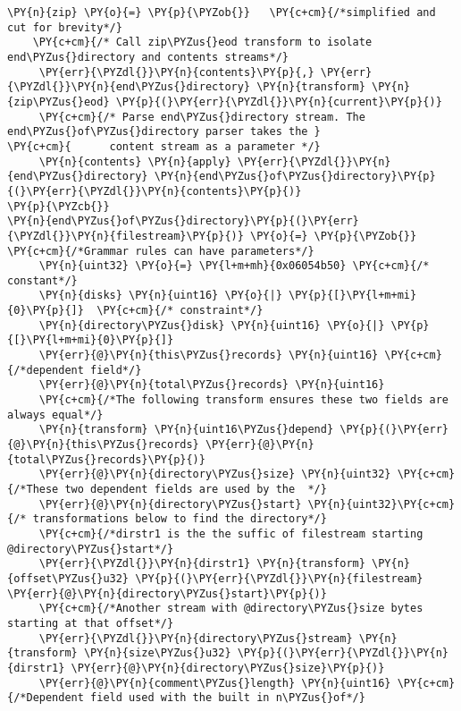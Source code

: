 \begin{Verbatim}[commandchars=\\\{\},codes={\catcode`\$=3\catcode`\^=7\catcode`\_=8}]
\PY{n}{zip} \PY{o}{=} \PY{p}{\PYZob{}}   \PY{c+cm}{/*simplified and cut for brevity*/}
    \PY{c+cm}{/* Call zip\PYZus{}eod transform to isolate end\PYZus{}directory and contents streams*/}
     \PY{err}{\PYZdl{}}\PY{n}{contents}\PY{p}{,} \PY{err}{\PYZdl{}}\PY{n}{end\PYZus{}directory} \PY{n}{transform} \PY{n}{zip\PYZus{}eod} \PY{p}{(}\PY{err}{\PYZdl{}}\PY{n}{current}\PY{p}{)}
     \PY{c+cm}{/* Parse end\PYZus{}directory stream. The end\PYZus{}of\PYZus{}directory parser takes the }
\PY{c+cm}{      content stream as a parameter */}
     \PY{n}{contents} \PY{n}{apply} \PY{err}{\PYZdl{}}\PY{n}{end\PYZus{}directory} \PY{n}{end\PYZus{}of\PYZus{}directory}\PY{p}{(}\PY{err}{\PYZdl{}}\PY{n}{contents}\PY{p}{)}
\PY{p}{\PYZcb{}}
\PY{n}{end\PYZus{}of\PYZus{}directory}\PY{p}{(}\PY{err}{\PYZdl{}}\PY{n}{filestream}\PY{p}{)} \PY{o}{=} \PY{p}{\PYZob{}} \PY{c+cm}{/*Grammar rules can have parameters*/}
     \PY{n}{uint32} \PY{o}{=} \PY{l+m+mh}{0x06054b50} \PY{c+cm}{/* constant*/}
     \PY{n}{disks} \PY{n}{uint16} \PY{o}{|} \PY{p}{[}\PY{l+m+mi}{0}\PY{p}{]}  \PY{c+cm}{/* constraint*/}
     \PY{n}{directory\PYZus{}disk} \PY{n}{uint16} \PY{o}{|} \PY{p}{[}\PY{l+m+mi}{0}\PY{p}{]}
     \PY{err}{@}\PY{n}{this\PYZus{}records} \PY{n}{uint16} \PY{c+cm}{/*dependent field*/}
     \PY{err}{@}\PY{n}{total\PYZus{}records} \PY{n}{uint16} 
     \PY{c+cm}{/*The following transform ensures these two fields are always equal*/}
     \PY{n}{transform} \PY{n}{uint16\PYZus{}depend} \PY{p}{(}\PY{err}{@}\PY{n}{this\PYZus{}records} \PY{err}{@}\PY{n}{total\PYZus{}records}\PY{p}{)}
     \PY{err}{@}\PY{n}{directory\PYZus{}size} \PY{n}{uint32} \PY{c+cm}{/*These two dependent fields are used by the  */}
     \PY{err}{@}\PY{n}{directory\PYZus{}start} \PY{n}{uint32}\PY{c+cm}{/* transformations below to find the directory*/}
     \PY{c+cm}{/*dirstr1 is the the suffic of filestream starting @directory\PYZus{}start*/}
     \PY{err}{\PYZdl{}}\PY{n}{dirstr1} \PY{n}{transform} \PY{n}{offset\PYZus{}u32} \PY{p}{(}\PY{err}{\PYZdl{}}\PY{n}{filestream} \PY{err}{@}\PY{n}{directory\PYZus{}start}\PY{p}{)} 
     \PY{c+cm}{/*Another stream with @directory\PYZus{}size bytes starting at that offset*/}
     \PY{err}{\PYZdl{}}\PY{n}{directory\PYZus{}stream} \PY{n}{transform} \PY{n}{size\PYZus{}u32} \PY{p}{(}\PY{err}{\PYZdl{}}\PY{n}{dirstr1} \PY{err}{@}\PY{n}{directory\PYZus{}size}\PY{p}{)}
     \PY{err}{@}\PY{n}{comment\PYZus{}length} \PY{n}{uint16} \PY{c+cm}{/*Dependent field used with the built in n\PYZus{}of*/}

\end{Verbatim}
